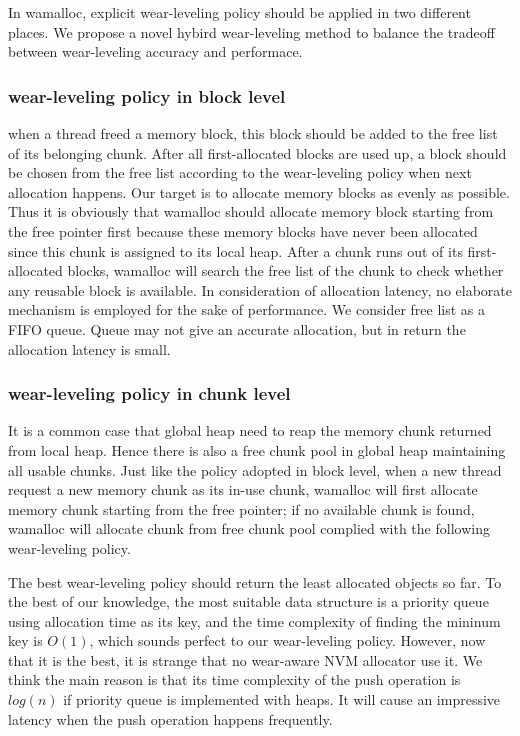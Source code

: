 \documentclass{vldb}
\begin{document}
In wamalloc, explicit wear-leveling policy should be applied in two different places. 
We propose a novel hybird wear-leveling method to balance the tradeoff between wear-leveling accuracy and performace.

\subsubsection{wear-leveling policy in block level}
when a thread freed a memory block, this block should be added to the free list of its belonging chunk.
After all first-allocated blocks are used up, a block should be chosen from the free list according to the wear-leveling policy when next allocation happens.
Our target is to allocate memory blocks as evenly as possible.
Thus it is obviously that wamalloc should allocate memory block starting from the free pointer first
because these memory blocks have never been allocated since this chunk is assigned to its local heap.
After a chunk runs out of its first-allocated blocks, wamalloc will search the free list of the chunk to check whether any reusable block is available.
In consideration of allocation latency, no elaborate mechanism is employed for the sake of performance.
We consider free list as a FIFO queue. Queue may not give an accurate allocation, but in return the allocation latency is small.

\subsubsection{wear-leveling policy in chunk level}
It is a common case that global heap need to reap the memory chunk returned from local heap.
Hence there is also a free chunk pool in global heap maintaining all usable chunks. 
Just like the policy adopted in block level, 
when a new thread request a new memory chunk as its in-use chunk,
wamalloc will first allocate memory chunk starting from the free pointer; 
if no available chunk is found, wamalloc will allocate chunk from free chunk pool complied with the following wear-leveling policy.

The best wear-leveling policy should return the least allocated objects so far. 
To the best of our knowledge, the most suitable data structure is a priority queue using allocation time as its key,
and the time complexity of finding the mininum key is $O(1)$, which sounds perfect to our wear-leveling policy.
However, now that it is the best, it is strange that no wear-aware NVM allocator use it.
We think the main reason is that its time complexity of the push operation is $log(n)$ if priority queue is implemented with heaps. 
It will cause an impressive latency when the push operation happens frequently.
\end{document}
